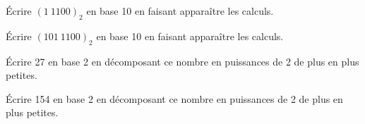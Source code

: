\documentclass[a4paper,12pt,eval,firamath]{nsi}
\begin{document}
\maketitle

\'Ecrire $(1\ 1100)_2$ en base 10 en faisant apparaître les calculs.\\


\'Ecrire $(101\ 1100)_2$ en base 10 en faisant apparaître les calculs.\\


\'Ecrire 27 en base 2 en décomposant ce nombre en puissances de 2 de plus en plus petites.\\


\'Ecrire 154 en base 2 en décomposant ce nombre en puissances de 2 de plus en plus petites.\\

\end{document}
